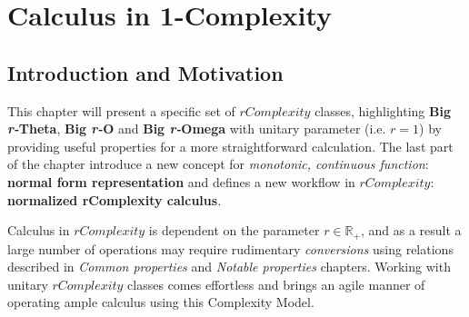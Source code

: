 
\chapter{Calculus in 1-Complexity}




\section{Introduction and Motivation}
This chapter will present a specific set of $rComplexity$ classes, highlighting \textbf{Big \textit{r-}Theta}, \textbf{Big \textit{r-}O} and \textbf{Big \textit{r-}Omega} with unitary parameter (i.e. $r = 1$) by providing useful properties for a more straightforward calculation. The last part of the chapter introduce a new concept for \textit{monotonic, continuous function}: \textbf{normal form representation} and defines a new workflow in $rComplexity$: \textbf{normalized rComplexity calculus}.

Calculus in $rComplexity$ is dependent on the parameter $r \in \mathbb{R}_{+}$, and as a result a large number of operations may require rudimentary \textit{conversions} using relations described in \textit{Common properties} and \textit{Notable properties} chapters. Working with unitary $rComplexity$ classes comes effortless and brings an agile manner of operating ample
calculus using this Complexity Model.

